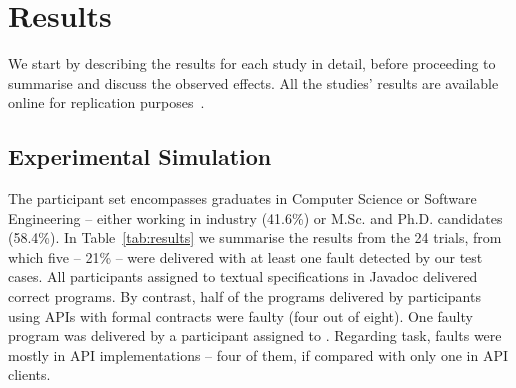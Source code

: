 \section{Results}
\label{sec:results}

We start by describing the results for each study in detail, before proceeding to summarise and discuss the observed effects. All the studies' results are available online for replication purposes~\cite{Data-Results}.

\subsection{Experimental Simulation}
\label{sec:expResults}

The participant set encompasses graduates in Computer Science or Software Engineering -- either working in industry (41.6\%) or M.Sc. and Ph.D. candidates (58.4\%).
In Table~\ref{tab:results} we summarise the results from the 24 trials, from which five -- 21\% -- were delivered with at least one fault detected by our test cases.
All participants assigned to textual specifications in Javadoc delivered correct programs.
By contrast, half of the programs delivered by participants using APIs with formal contracts were faulty (four out of eight).
One faulty program was delivered by a participant assigned to \contractjdoc{}.
Regarding task, faults were mostly in API implementations -- four of them, if compared with only one in API clients.




